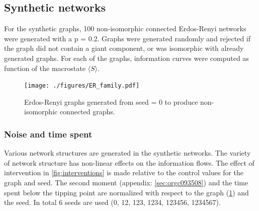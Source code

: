 \documentclass[a4paper, 11pt, twocolumn]{article}
\begin{document}
\subsection{Synthetic networks}
\label{sec:org51f1162}
For  the  synthetic  graphs,  100  non-isomorphic  connected
Erdos-Renyi networks were  generated with a p  = 0.2. Graphs
were generated  randomly and rejected  if the graph  did not
contain a  giant component,  or was isomorphic  with already
generated graphs. For each of the graphs, information curves
were computed as function of the macrostate \(\langle S \rangle\).

\begin{figure}[htbp]
\centering
\texttt{[image: ./figures/ER\_family.pdf]}
\caption{\label{fig:ER_family}Erdos-Renyi graphs generated from seed = 0 to produce non-isomorphic connected graphs.}
\end{figure}

\subsubsection{Noise and time spent}
\label{sec:org123df58}
Various network  structures are  generated in  the synthetic
networks. The  variety of  network structure  has non-linear
effects on the information flows. The effect of intervention
in \cref{fig:interventions} is made relative  to the control values for
the  graph and  seed. The  second moment  (appendix: \ref{sec:orgc093508}) and the time spent below the tipping
point   are   normalized   with   respect   to   the   graph
(\cref{fig:ER_family}) and  the seed.  In total 6  seeds are
used (0, 12, 123, 1234, 123456, 1234567).
\end{document}
